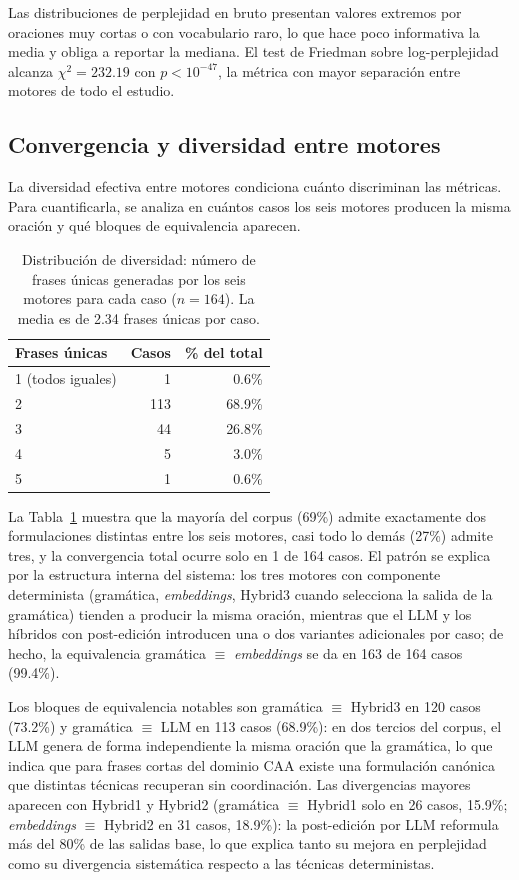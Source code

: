 Las distribuciones de perplejidad en bruto presentan valores extremos por oraciones muy cortas o con vocabulario raro, lo que hace poco informativa la media y obliga a reportar la mediana. El test de Friedman sobre log-perplejidad alcanza $\chi^2 = 232.19$ con $p < 10^{-47}$, la métrica con mayor separación entre motores de todo el estudio.

\subsection{Convergencia y diversidad entre motores}
\label{sec:eval-convergencia}

La diversidad efectiva entre motores condiciona cuánto discriminan las métricas. Para cuantificarla, se analiza en cuántos casos los seis motores producen la misma oración y qué bloques de equivalencia aparecen.

\begin{table}[ht]
\centering
\begin{tabular}{l r r}
\hline
Frases únicas & Casos & \% del total \\
\hline
1 (todos iguales) & 1 & 0.6\% \\
2 & 113 & 68.9\% \\
3 & 44 & 26.8\% \\
4 & 5 & 3.0\% \\
5 & 1 & 0.6\% \\
\hline
\end{tabular}
\caption{Distribución de diversidad: número de frases únicas generadas por los seis motores para cada caso ($n=164$). La media es de 2.34 frases únicas por caso.}
\label{tab:eval-diversidad}
\end{table}

La Tabla~\ref{tab:eval-diversidad} muestra que la mayoría del corpus (69\%) admite exactamente dos formulaciones distintas entre los seis motores, casi todo lo demás (27\%) admite tres, y la convergencia total ocurre solo en 1 de 164 casos. El patrón se explica por la estructura interna del sistema: los tres motores con componente determinista (gramática, \textit{embeddings}, Hybrid3 cuando selecciona la salida de la gramática) tienden a producir la misma oración, mientras que el LLM y los híbridos con post-edición introducen una o dos variantes adicionales por caso; de hecho, la equivalencia gramática $\equiv$ \textit{embeddings} se da en 163 de 164 casos (99.4\%).

Los bloques de equivalencia notables son gramática $\equiv$ Hybrid3 en 120 casos (73.2\%) y gramática $\equiv$ LLM en 113 casos (68.9\%): en dos tercios del corpus, el LLM genera de forma independiente la misma oración que la gramática, lo que indica que para frases cortas del dominio CAA existe una formulación canónica que distintas técnicas recuperan sin coordinación. Las divergencias mayores aparecen con Hybrid1 y Hybrid2 (gramática $\equiv$ Hybrid1 solo en 26 casos, 15.9\%; \textit{embeddings} $\equiv$ Hybrid2 en 31 casos, 18.9\%): la post-edición por LLM reformula más del 80\% de las salidas base, lo que explica tanto su mejora en perplejidad como su divergencia sistemática respecto a las técnicas deterministas.


